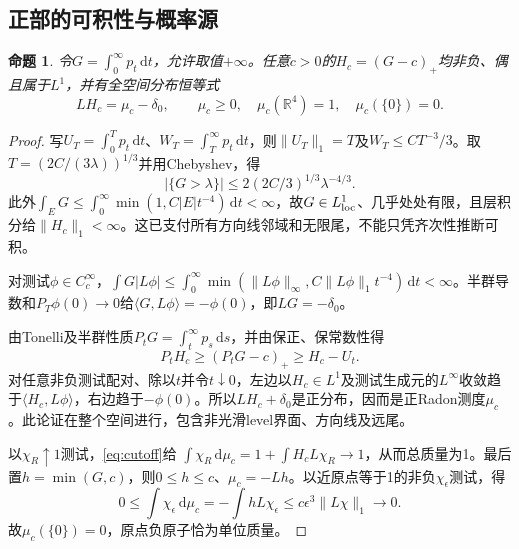 \documentclass[UTF8,11pt,a4paper,fontset=fandol]{ctexart}
\newtheorem{proposition}[theorem]{命题}
\theoremstyle{remark}\newtheorem{remark}[theorem]{注}
\newcommand{\R}{\mathbb R}\newcommand{\dd}{\,\mathrm d}
\newcommand{\1}{\mathbf1}\newcommand{\pos}[1]{(#1)_+}
\begin{document}
\subsection{正部的可积性与概率源}
\begin{proposition}\label{prop:source}
令$G=\int_0^\infty p_t\dd t$，允许取值$+\infty$。任意$c>0$的$H_c=(G-c)_+$均非负、偶且属于$L^1$，并有全空间分布恒等式
\begin{equation}\label{eq:source}
 LH_c=\mu_c-\delta_0,
 \qquad \mu_c\ge0,\quad \mu_c(\R^4)=1,\quad\mu_c(\{0\})=0.
\end{equation}
\end{proposition}
\begin{proof}
写$U_T=\int_0^Tp_t\dd t$、$W_T=\int_T^\infty p_t\dd t$，则$\|U_T\|_1=T$及$W_T\le CT^{-3}/3$。取$T=(2C/(3\lambda))^{1/3}$并用Chebyshev，得
\[
 |\{G>\lambda\}|\le2(2C/3)^{1/3}\lambda^{-4/3}.
\]
此外$\int_EG\le\int_0^\infty\min(1,C|E|t^{-4})\dd t<\infty$，故$G\in L^1_{\rm loc}$、几乎处处有限，且层积分给$\|H_c\|_1<\infty$。这已支付所有方向线邻域和无限尾，不能只凭齐次性推断可积。

对测试$\phi\in C_c^\infty$，$\int G|L\phi|\le\int_0^\infty\min(\|L\phi\|_\infty,C\|L\phi\|_1t^{-4})\dd t<\infty$。半群导数和$P_T\phi(0)\to0$给$\langle G,L\phi\rangle=-\phi(0)$，即$LG=-\delta_0$。

由Tonelli及半群性质$P_tG=\int_t^\infty p_s\dd s$，并由保正、保常数性得
\[
 P_tH_c\ge(P_tG-c)_+\ge H_c-U_t.
\]
对任意非负测试配对、除以$t$并令$t\downarrow0$，左边以$H_c\in L^1$及测试生成元的$L^\infty$收敛趋于$\langle H_c,L\phi\rangle$，右边趋于$-\phi(0)$。所以$LH_c+\delta_0$是正分布，因而是正Radon测度$\mu_c$。此论证在整个空间进行，包含非光滑level界面、方向线及远尾。

以$\chi_R\uparrow1$测试，\eqref{eq:cutoff}给
$\int\chi_R\dd\mu_c=1+\int H_cL\chi_R\to1$，从而总质量为1。最后置$h=\min(G,c)$，则$0\le h\le c$、$\mu_c=-Lh$。以近原点等于1的非负$\chi_\epsilon$测试，得
\[
 0\le\int\chi_\epsilon\dd\mu_c=-\int hL\chi_\epsilon
 \le c\epsilon^3\|L\chi\|_1\longrightarrow0.
\]
故$\mu_c(\{0\})=0$，原点负原子恰为单位质量。
\end{proof}
\end{document}
